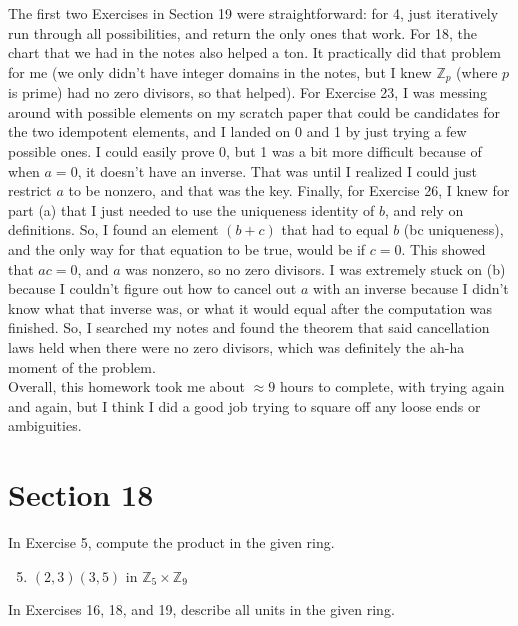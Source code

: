 \documentclass[12pt, oneside]{book}
\newcommand{\Z}{\mathbb{Z}}
\newenvironment{solution}{\textit{Solution.}}
\newcommand{\sol}[1]{
    \begin{customframedproof}[linecolor=orangehdx!75,]
        \begin{solution}
        #1
        \end{solution}
    \end{customframedproof}
}
\begin{document}
The first two Exercises in Section 19 were straightforward: for 4, just iteratively run through all possibilities, and return the only ones that work. For 18, the chart that we had in the notes also helped a ton. It practically did that problem for me (we only didn't have integer domains in the notes, but I knew \(\Z_{p}\) (where \(p\) is prime) had no zero divisors, so that helped). For Exercise 23, I was messing around with possible elements on my scratch paper that could be candidates for the two idempotent elements, and I landed on 0 and 1 by just trying a few possible ones. I could easily prove 0, but 1 was a bit more difficult because of when \(a = 0\), it doesn't have an inverse. That was until I realized I could just restrict \(a\) to be nonzero, and that was the key. Finally, for Exercise 26, I knew for part (a) that I just needed to use the uniqueness identity of \(b\), and rely on definitions. So, I found an element \((b + c)\) that had to equal \(b\) (bc uniqueness), and the only way for that equation to be true, would be if \(c = 0\). This showed that \(ac = 0\), and \(a\) was nonzero, so no zero divisors. I was extremely stuck on (b) because I couldn't figure out how to cancel out \(a\) with an inverse because I didn't know what that inverse was, or what it would equal after the computation was finished. So, I searched my notes and found the theorem that said cancellation laws held when there were no zero divisors, which was definitely the ah-ha moment of the problem. \\

Overall, this homework took me about \(\approx 9\) hours to complete, with trying again and again, but I think I did a good job trying to square off any loose ends or ambiguities. 


\newpage
\section*{Section 18}

In Exercise 5, compute the product in the given ring.
\begin{enumerate}
    \setcounter{enumi}{4}
    \item \((2,3)(3,5)\) in \(\Z_{5} \times \Z_{9}\)
    \sol{
        \[
            (2,3)(3,5) = (6, 15) = (6 \bmod 5, 15 \bmod 9) = (1, 6).
        \]
    }    
\end{enumerate}

In Exercises 16, 18, and 19, describe all units in the given ring.
\end{document}
